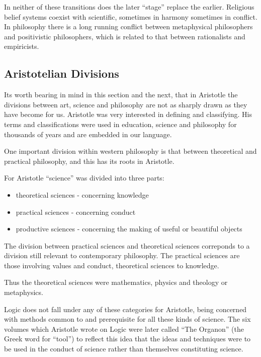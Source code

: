 \documentclass[10pt,titlepage]{article}
\begin{document}
In neither of these transitions does the later ``stage'' replace the earlier.
Religious belief systems coexist with scientific, sometimes in harmony sometimes in conflict.
In philosophy there is a long running conflict between metaphysical philosophers and positivistic philosophers, which is related to that between rationalists and empiricists.

\subsection{Aristotelian Divisions}

Its worth bearing in mind in this section and the next, that in Aristotle the divisions between art, science and philosophy are not as sharply drawn as they have become for us.
Aristotle was very interested in defining and classifying.
His terms and classifications were used in education, science and philosophy for thousands of years and are embedded in our language.

One important division within western philosophy is that between theoretical and practical philosophy, and this has its roots in Aristotle.

For Aristotle ``science'' was divided into three parts:

\begin{itemize}

\item theoretical sciences - concerning knowledge

\item practical sciences - concerning conduct

\item productive sciences - concerning the making of useful or beautiful objects

\end{itemize}

The division between practical sciences and theoretical sciences correponds to a division still relevant to contemporary philosophy.
The practical sciences are those involving values and conduct, theoretical sciences to knowledge.

Thus the theoretical sciences were mathematics, physics and theology or metaphysics.

Logic does not fall under any of these categories for Aristotle, being concerned with methods common to and prerequisite for all these kinds of science.
The six volumes which Aristotle wrote on Logic were later called ``The Organon'' (the Greek word for ``tool'') to reflect this idea that the ideas and techniques were to be used in the conduct of science rather than themselves constituting science.
\end{document}
